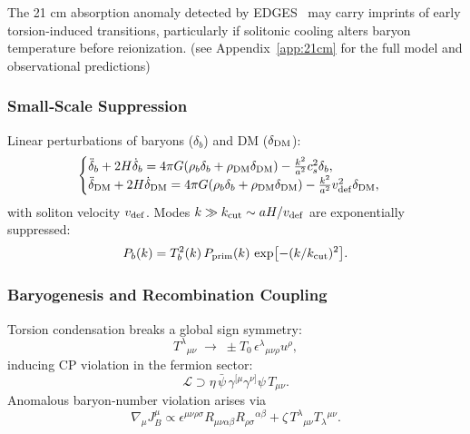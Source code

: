 \documentclass{article}
\begin{document}
The 21 cm absorption anomaly detected by EDGES~\cite{bowman2018edges} may carry imprints of early torsion-induced transitions, particularly if solitonic cooling alters baryon temperature before reionization.
(see Appendix~\ref{app:21cm} for the full model and observational predictions)


\subsubsection{ Small‐Scale Suppression}
Linear perturbations of baryons (\(\delta_b\)) and DM (\(\delta_{\rm DM}\)):
\begin{equation}\label{eq:auto129}
\begin{cases}
  \ddot\delta_b+2H\dot\delta_b
    =4\pi G(\rho_b\delta_b+\rho_{\rm DM}\delta_{\rm DM})
     -\tfrac{k^2}{a^2}c_s^2\delta_b,\\
  \ddot\delta_{\rm DM}+2H\dot\delta_{\rm DM}
    =4\pi G(\rho_b\delta_b+\rho_{\rm DM}\delta_{\rm DM})
     -\tfrac{k^2}{a^2}v_{\rm def}^2\delta_{\rm DM},
\end{cases}
\end{equation}
with soliton velocity \(v_{\rm def}\).  Modes \(k\gg k_{\rm cut}\sim aH/v_{\rm def}\)
are exponentially suppressed:
\begin{equation}\label{eq:auto130}
P_b(k)=T_b^2(k)\,P_{\rm prim}(k)\,\exp\bigl[-(k/k_{\rm cut})^2\bigr].
\end{equation}

\subsubsection{ Baryogenesis and Recombination Coupling}
Torsion condensation breaks a global sign symmetry:
\begin{equation}\label{eq:auto131}
T^{\lambda}{}_{\mu\nu}
  \;\to\;
  \pm T_0\,\epsilon^{\lambda}{}_{\mu\nu\rho}u^\rho,
\end{equation}
inducing CP violation in the fermion sector:
\begin{equation}\label{eq:auto132}
\mathcal L \supset \eta\,\bar\psi\,\gamma^{[\mu}\gamma^{\nu]}\psi\,T_{\mu\nu}.
\end{equation}
Anomalous baryon‐number violation arises via
\begin{equation}\label{eq:auto133}
\nabla_\mu J_B^\mu
  \propto \epsilon^{\mu\nu\rho\sigma}
    R_{\mu\nu\alpha\beta}R_{\rho\sigma}{}^{\alpha\beta}
  +\zeta\,T^{\lambda}{}_{\mu\nu}T_{\lambda}{}^{\mu\nu}.
\end{equation}
\end{document}
